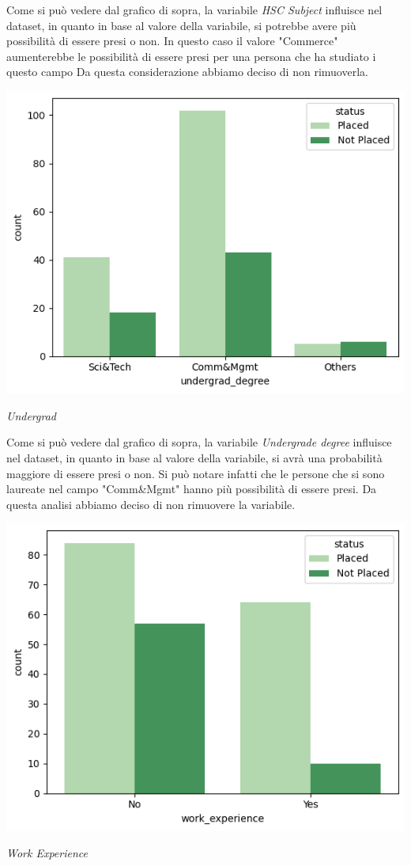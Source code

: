 \documentclass[12pt]{article}
\begin{document}
Come si può vedere dal grafico di sopra, la variabile \textit{HSC Subject} influisce nel dataset, in quanto in base al valore della variabile, si potrebbe avere più possibilità di essere presi o non. In questo caso il valore "Commerce" aumenterebbe le possibilità di essere presi per una persona che ha studiato i questo campo
Da questa considerazione abbiamo deciso di non rimuoverla.
\begin{center}
    \includegraphics[scale=0.5]{undergraddegree.png}

    \textit{Undergrad}
\end{center}
Come si può vedere dal grafico di sopra, la variabile \textit{Undergrade degree} influisce nel dataset, in quanto in base al valore della variabile, si avrà una probabilità maggiore di essere presi o non. Si può notare infatti che le persone che si sono laureate nel campo "Comm\&Mgmt" hanno più possibilità di essere presi.
Da questa analisi abbiamo deciso di non rimuovere la variabile.
\begin{center}
    \includegraphics[scale=0.5]{workexperience.png}

    \textit{Work Experience}
\end{center}
\end{document}
